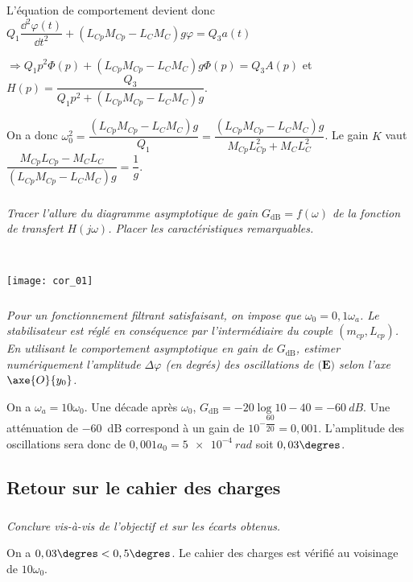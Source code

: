 \begin{multicols}{2}
\begin{corrige}
L'équation de comportement devient donc  $Q_1\dfrac{\dd^2\varphi(t) }{\dd t^2}+\left(   L_{Cp}M_{Cp} - L_CM_C \right)g  \varphi=Q_3a(t)$ 

$ \Rightarrow Q_1 p^2 \Phi(p) + \left(   L_{Cp}M_{Cp} - L_CM_C \right)g  \Phi(p)=Q_3A(p)$ et $H(p)=\dfrac{Q_3}{ Q_1 p^2  + \left(   L_{Cp}M_{Cp} - L_CM_C \right)g  }$.

On a donc $\omega_0^2 = \dfrac{\left(   L_{Cp}M_{Cp} - L_CM_C \right)g }{Q_1}=\dfrac{\left(   L_{Cp}M_{Cp} - L_CM_C \right)g }{ M_{Cp}L_{Cp}^2+M_{C}L_{C}^2}$. 
Le gain $K$ vaut $\dfrac{M_{Cp}L_{Cp}- M_CL_C}{\left(   L_{Cp}M_{Cp} - L_CM_C \right)g}=\dfrac{1}{g}$.
\end{corrige}
\else
\fi

\subparagraph{}
\textit{Tracer l'allure du diagramme asymptotique de gain $G_{\text{dB}}=f\left( \omega\right)$ de la fonction de transfert $H\left(j\omega\right)$. Placer les caractéristiques remarquables.}
\ifprof
\begin{corrige}~\\

\begin{center}
\texttt{[image: cor\_01]}
\end{center}
\end{corrige}
\else
\fi


\subparagraph{}
\textit{Pour un fonctionnement filtrant satisfaisant, on impose que $\omega_0=0,1\omega_a$. Le stabilisateur est réglé en
conséquence par l’intermédiaire du couple $\left( m_{cp},L_{cp}\right)$. En utilisant le comportement asymptotique en gain de $G_{\text{dB}}$, estimer numériquement l'amplitude $\Delta \varphi$ (en degrés) des oscillations de $\textbf{(E)}$
selon l'axe $\axe{O}{y_0}$.}
\ifprof
\begin{corrige}
On a $\omega_a=10\omega_0$. Une décade après $\omega_0$, $G_{\text{dB}}=-20\log 10 - 40 = \SI{-60}{dB}$. Une atténuation de \SI{-60}{dB} correspond à un gain de $10^{-\dfrac{60}{20}}=0,001$. L'amplitude des oscillations sera donc de $0,001 a_0 = \SI{5e-4}{rad}$ soit $0,03 \degres$.


\end{corrige}
\else
\fi


\subsection*{Retour sur le cahier des charges}

\subparagraph{}
\textit{Conclure vis-à-vis de l'objectif et sur les écarts obtenus.}
\ifprof
\begin{corrige}
On a $0,03 \degres < 0,5\degres$. Le cahier des charges est vérifié au voisinage de $10\omega_0$.
\end{corrige}
\else
\fi




\end{multicols}

